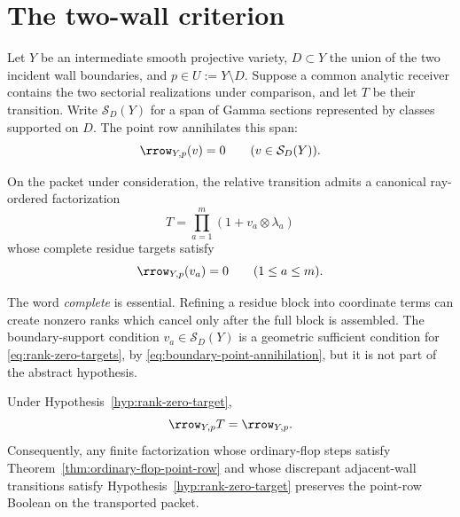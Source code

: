 \section{The two-wall criterion}
\label{sec:two-wall}

Let \(Y\) be an intermediate smooth projective variety, \(D\subset Y\) the
union of the two incident wall boundaries, and \(p\in U:=Y\setminus D\).
Suppose a common analytic receiver contains the two sectorial realizations
under comparison, and let \(T\) be their transition.  Write
\(\mathcal S_D(Y)\) for a span of Gamma sections represented by classes
supported on \(D\).  The point row annihilates this span:
\begin{equation}\label{eq:boundary-point-annihilation}
 \rrow_{Y,p}(v)=0\qquad(v\in\mathcal S_D(Y)).
\end{equation}

\begin{hypothesis}
\label{hyp:rank-zero-target}
On the packet under consideration, the relative transition admits a
canonical ray-ordered factorization
\begin{equation}\label{eq:ray-transition-factorization}
 T=\prod_{a=1}^m(1+v_a\otimes\lambda_a)
\end{equation}
whose complete residue targets satisfy
\begin{equation}\label{eq:rank-zero-targets}
 \rrow_{Y,p}(v_a)=0\qquad(1\le a\le m).
\end{equation}
\end{hypothesis}

The word \emph{complete} is essential.  Refining a residue block into
coordinate terms can create nonzero ranks which cancel only after the full
block is assembled.  The boundary-support condition
\(v_a\in\mathcal S_D(Y)\) is a geometric sufficient condition for
\eqref{eq:rank-zero-targets}, by \eqref{eq:boundary-point-annihilation}, but
it is not part of the abstract hypothesis.

\begin{theorem}
\label{thm:rank-zero-target}
Under Hypothesis~\ref{hyp:rank-zero-target},
\begin{equation}\label{eq:point-row-transition}
 \rrow_{Y,p}T=\rrow_{Y,p}.
\end{equation}
Consequently, any finite factorization whose ordinary-flop steps satisfy
Theorem~\ref{thm:ordinary-flop-point-row} and whose discrepant adjacent-wall
transitions satisfy Hypothesis~\ref{hyp:rank-zero-target} preserves the
point-row Boolean on the transported packet.
\end{theorem}

